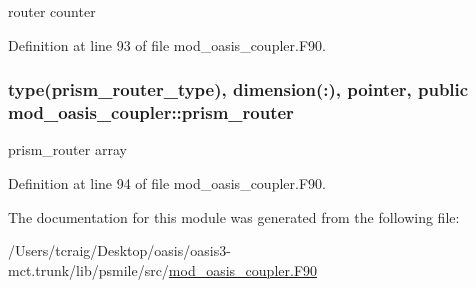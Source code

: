 router counter 



Definition at line 93 of file mod\+\_\+oasis\+\_\+coupler.\+F90.

\hypertarget{classmod__oasis__coupler_a33dbf692ad73f83f73fe083e252badd8}{
\subsubsection[{prism\+\_\+router}]{\setlength{\rightskip}{0pt plus 5cm}type({\bf prism\+\_\+router\+\_\+type}), dimension(\+:), pointer, public mod\+\_\+oasis\+\_\+coupler\+::prism\+\_\+router}}\label{classmod__oasis__coupler_a33dbf692ad73f83f73fe083e252badd8}


prism\+\_\+router array 



Definition at line 94 of file mod\+\_\+oasis\+\_\+coupler.\+F90.



The documentation for this module was generated from the following file\+:\begin{DoxyCompactItemize}
\item 
/\+Users/tcraig/\+Desktop/oasis/oasis3-\/mct.\+trunk/lib/psmile/src/\hyperlink{mod__oasis__coupler_8_f90}{mod\+\_\+oasis\+\_\+coupler.\+F90}\end{DoxyCompactItemize}
